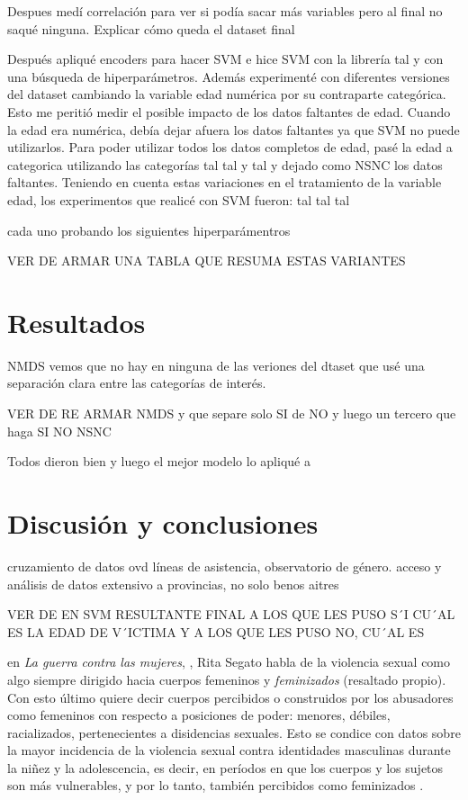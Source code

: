 \documentclass[10 pt]{article}
\begin{document}
Despues medí correlación para ver si podía sacar más variables pero al final no saqué ninguna. Explicar cómo queda el dataset final

Después apliqué encoders para hacer SVM e hice SVM con la librería tal y con una búsqueda de hiperparámetros. Además experimenté con diferentes versiones del dataset cambiando la variable edad numérica por su contraparte categórica. Esto me peritió medir el posible impacto de los datos faltantes de edad. Cuando la edad era numérica, debía dejar afuera los datos faltantes ya que SVM no puede utilizarlos. Para poder utilizar todos los datos completos de edad, pasé la edad a categorica  utilizando las categorías tal tal y tal y dejado como NSNC los datos faltantes. Teniendo en cuenta estas variaciones en el tratamiento de la variable edad, los experimentos que realicé con SVM fueron: 
tal tal tal

cada uno probando los siguientes hiperparámentros

VER DE ARMAR UNA TABLA QUE RESUMA ESTAS VARIANTES 


\section*{Resultados}\label{resultados}
NMDS vemos que no hay en ninguna de las veriones del dtaset que usé una separación clara entre las categorías de interés.

VER DE RE ARMAR NMDS y que separe solo SI de NO y luego un tercero que haga SI NO NSNC

Todos dieron bien y luego el mejor modelo lo apliqué a 

\section*{Discusión y conclusiones}\label{conc}
cruzamiento de datos ovd líneas de asistencia, observatorio de género.
acceso y análisis de datos extensivo a provincias, no solo benos aitres


VER DE EN SVM RESULTANTE FINAL A LOS QUE LES PUSO S´I CU´AL ES LA EDAD DE V´ICTIMA Y A LOS QUE LES PUSO NO, CU´AL ES

en \textit{La guerra contra las mujeres}, \citeyearpar{segato2016guerra}, Rita Segato habla de la violencia sexual como algo siempre dirigido hacia cuerpos femeninos y \textit{feminizados} (resaltado propio). Con esto último quiere decir cuerpos percibidos o construidos por los abusadores como femeninos con respecto a posiciones de poder: menores, débiles, racializados, pertenecientes a disidencias sexuales. Esto se condice con datos sobre la mayor incidencia de la violencia sexual contra identidades masculinas durante la niñez y la adolescencia, es decir, en períodos en que los cuerpos y los sujetos son más vulnerables, y por lo tanto, también percibidos como feminizados \citep*{contreras2016violencia,ufem_relevamiento,ferris2002world}.
\end{document}

